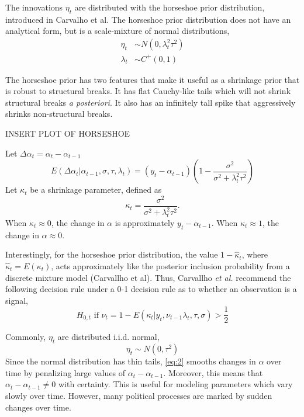 \documentclass{article}
\begin{document}
The innovations $\eta_{t}$ are distributed with the horseshoe prior distribution, introduced in Carvalho et al.
The horseshoe prior distribution does not have an analytical form, but is a scale-mixture of normal distributions,
\begin{align}
  \label{eq:12}
  \eta_{t} &\sim N(0, \lambda_{t}^{2} \tau^{2}) \\
  \label{eq:13}
  \lambda_{t} &\sim C^{+}(0, 1)
\end{align}

The horseshoe prior has two features that make it useful as a shrinkage prior that is robust to structural breaks.
It has flat Cauchy-like tails which will not shrink structural breaks \textit{a posteriori}.
It also has an infinitely tall spike that aggressively shrinks non-structural breaks.

INSERT PLOT OF HORSESHOE


Let $\Delta \alpha_{t} = \alpha_{t} - \alpha_{t - 1}$
\begin{equation}
  \label{eq:10}
  E(\Delta \alpha_{t} | \alpha_{t - 1}, \sigma, \tau, \lambda_{t}) = (y_{t} - \alpha_{t - 1})
  \left(
    1 - \frac{\sigma^{2}}{\sigma^{2} + \lambda^{2}_{t} \tau^{2}}
  \right)
\end{equation}
Let $\kappa_{t}$ be a shrinkage parameter, defined as
\begin{equation}
  \label{eq:3}
  \kappa_{t} = \frac{\sigma^{2}}{\sigma^{2} + \lambda^{2}_{t} \tau^{2}} \text{.}
\end{equation}
When $\kappa_{t} \approx 0$, the change in $\alpha$ is approximately $y_{t} - \alpha_{t-1}$.
When $\kappa_{t} \approx 1$, the change in $\alpha \approx 0$.

Interestingly, for the horseshoe prior distribution, the value $1 - \hat\kappa_{t}$, where $\hat\kappa_{t} = E(\kappa_{t})$, acts approximately like the posterior inclusion probability from a discrete mixture model (Carvallho et al).
Thus, Carvallho \textit{et al.} recommend the following  decision rule under a 0-1 decision rule as to whether an observation is a signal,
\begin{equation}
  \label{eq:5}
  \text{$H_{0,t}$ if $\nu_{t} = 1 - E(\kappa_{t}|y_{t}, \nu_{t-1} \lambda_{t}, \tau, \sigma) > \frac{1}{2}$}
\end{equation}

Commonly, $\eta_{t}$ are distributed i.i.d. normal,
\begin{equation}
  \label{eq:2}
  \eta_{t} \sim N(0, \tau^{2})
\end{equation}
Since the normal distribution has thin tails, \eqref{eq:2} smooths changes in $\alpha$ over time by penalizing large values of $\alpha_{t} - \alpha_{t-1}$.
Moreover, this means that $\alpha_{t} - \alpha_{t-1} \neq 0$ with certainty.
This is useful for modeling parameters which vary slowly over time.
However, many political processes are marked by sudden changes over time.
\end{document}
